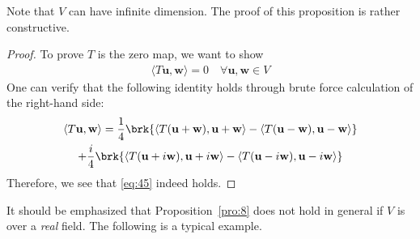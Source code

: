 \documentclass[thmcnt=section, color=blue, 12pt]{my-elegantbook}
\begin{document}
\begin{note}
	Note that $V$ can have infinite dimension.
	The proof of this proposition is rather constructive.
\end{note}

\begin{proof}
	To prove $T$ is the zero map, we want to show 
	\begin{align}
		\langle T \mathbf{u}, \mathbf{w} \rangle = 0
		\quad \forall \mathbf{u}, \mathbf{w} \in V
		\label{eq:45}
	\end{align}
	One can verify that the following
	identity holds through brute force calculation 
	of the right-hand side:
	\begin{multline*}
		\langle T \mathbf{u}, \mathbf{w} \rangle
		= \frac{1}{4} \brk{
			\langle T (\mathbf{u} + \mathbf{w}), 
			\mathbf{u} + \mathbf{w} \rangle
			-\langle T (\mathbf{u} - \mathbf{w}), 
			\mathbf{u} - \mathbf{w} \rangle
		} \\
		+ \frac{i}{4} \brk{
			\langle T (\mathbf{u} + i\mathbf{w}), 
			\mathbf{u} + i\mathbf{w} \rangle
			-\langle T (\mathbf{u} - i\mathbf{w}), 
			\mathbf{u} - i \mathbf{w} \rangle
		}
	\end{multline*}
	Therefore, we see that \eqref{eq:45} indeed holds.
\end{proof}

It should be emphasized that Proposition~\ref{pro:8} does not hold
in general if $V$ is over a \textit{real} field.
The following is a typical example.
\end{document}
